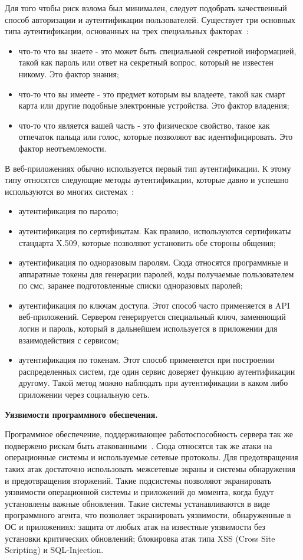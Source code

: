 Для того чтобы риск взлома был минимален, следует подобрать качественный способ авторизации и аутентификации пользователей. Существует три основных типа аутентификации, основанных на трех специальных факторах~\cite{pandya2015overview}:

\begin{itemize}
	\item что-то что вы знаете - это может быть специальной секретной информацией, такой как пароль или ответ на секретный вопрос, который не известен никому. Это фактор знания;
	\item что-то что вы имеете - это предмет которым вы владеете, такой как смарт карта или другие подобные электронные устройства. Это фактор владения;
	\item что-то что является вашей часть - это физическое свойство, такое как отпечаток пальца или голос, которые позволяют вас идентифицировать. Это фактор неотъемлемости.
\end{itemize}

В веб-приложениях обычно используется первый тип аутентификации. К этому типу относятся следующие методы аутентификации, которые давно и успешно используются во многих системах~\cite{DataArt}:

\begin{itemize}
	\item аутентификация по паролю;
	\item аутентификация по сертификатам. Как правило, используются сертификаты стандарта X.509, которые позволяют установить обе стороны общения;
	\item аутентификация по одноразовым паролям. Сюда относятся программные и аппаратные токены для генерации паролей, коды получаемые пользователем по смс, заранее подготовленные списки одноразовых паролей;
	\item аутентификация по ключам доступа. Этот способ часто применяется в API веб-приложений. Сервером генерируется специальный ключ, заменяющий логин и пароль, который в дальнейшем используется в приложении для взаимодействия с сервисом;
	\item аутентификация по токенам. Этот способ применяется при построении распределенных систем, где один сервис доверяет функцию аутентификации другому. Такой метод можно наблюдать при аутентификации в каком либо приложении через социальную сеть.
\end{itemize}

\textbf{Уязвимости программного обеспечения.}

Программное обеспечение, поддерживающее работоспособность сервера так же подвержено рискам быть атакованными~\cite{volkov2015analize}. Сюда относятся так же атаки на операционные системы и используемые сетевые протоколы. Для предотвращения таких атак достаточно использовать межсетевые экраны и системы обнаружения и предотвращения вторжений. Такие подсистемы позволяют экранировать уязвимости операционной системы и приложений до момента, когда будут установлены важные обновления. Такие системы устанавливаются в виде программного агента, что позволяет экранировать уязвимости, обнаруженные в ОС и приложениях: защита от любых атак на известные уязвимости без установки критических обновлений; блокировка атак типа XSS (Cross Site Scripting) и SQL-Injection.

